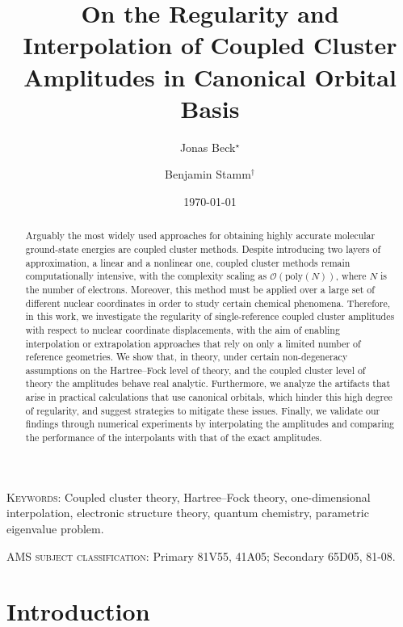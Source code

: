 \documentclass[reqno]{amsart}
\title[On the Regularity of Coupled Cluster Amplitudes]{On the Regularity and Interpolation of Coupled Cluster Amplitudes in Canonical Orbital Basis}
\author{Jonas Beck${}^\star$  \and Benjamin Stamm${}^\dagger$}
\date{\today}
\begin{document}
\begin{abstract}
Arguably the most widely used approaches for obtaining highly accurate molecular ground-state energies are coupled cluster methods. Despite introducing two layers of approximation, a linear and a nonlinear one, coupled cluster methods remain computationally intensive, with the complexity scaling as $\mathcal{O}(\mathrm{poly}(N))$, where $N$ is the number of electrons. Moreover, this method must be applied over a large set of different nuclear coordinates in order to study certain chemical phenomena. Therefore, in this work, we investigate the regularity of single-reference coupled cluster amplitudes with respect to nuclear coordinate displacements, with the aim of enabling interpolation or extrapolation approaches that rely on only a limited number of reference geometries. We show that, in theory, under certain non-degeneracy assumptions on the Hartree–Fock level of theory, and the coupled cluster level of theory the amplitudes behave real analytic. Furthermore, we analyze the artifacts that arise in practical calculations that use canonical orbitals, which hinder this high degree of regularity, and suggest strategies to mitigate these issues. Finally, we validate our findings through numerical experiments by interpolating the amplitudes and comparing the performance of the interpolants with that of the exact amplitudes.  
\end{abstract}

\maketitle
{\footnotesize \textsc{Keywords:} Coupled cluster theory, Hartree–Fock theory, one-dimensional interpolation, electronic structure theory, quantum chemistry, parametric eigenvalue problem.} 

{\footnotesize \textsc{AMS subject classification: } Primary 81V55, 41A05; Secondary 65D05, 81-08.}








\section{Introduction}\label{sec:intro}
\end{document}
